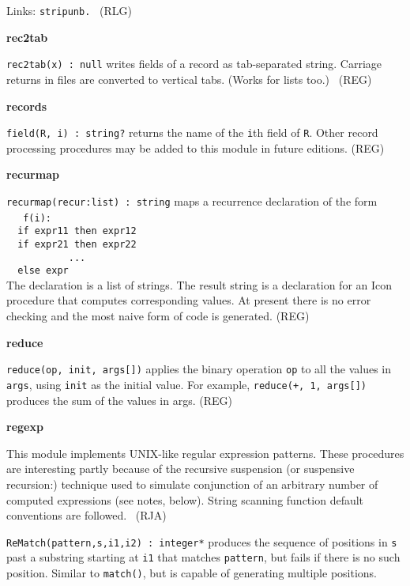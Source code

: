 Links: \texttt{stripunb.} \ (RLG)

{\sffamily\bfseries
rec2tab}

\texttt{rec2tab(x) : null} writes fields of a record as tab-separated
string. Carriage returns in files are converted to vertical tabs.
(Works for lists too.) \ (REG)

{\sffamily\bfseries
records}

\texttt{field(R, i) : string?} returns the name of the \texttt{i}th
field of \texttt{R}. Other record processing procedures may be added to
this module in future editions. (REG)

{\sffamily\bfseries
recurmap}

\texttt{recurmap(recur:list) : string} maps a recurrence declaration of
the form\\
 \ \ \texttt{\ f(i):\\
 \ \ if expr11 then expr12\\
 \ \ if expr21 then expr22\\
}\texttt{ \ \ \ \ \ \ \ \ \ \ ...\\
 \ \ else expr \\
}The declaration is a list of strings. The result string is a
declaration for an Icon procedure that computes corresponding values.
At present there is no error checking and the most naive form of code
is generated. (REG)

{\sffamily\bfseries
reduce}

\texttt{reduce(op, init, args[])} applies the binary
operation \texttt{op} to all the values in \texttt{args}, using
\texttt{init} as the initial value. For example,
\texttt{reduce({\textquotedbl}+{\textquotedbl}, 1, args[])} produces
the sum of the values in args. (REG)

{\sffamily\bfseries
regexp}

This module implements UNIX-like regular
expression patterns. These procedures are interesting partly because of
the {\textquotedbl}recursive suspension{\textquotedbl} (or
{\textquotedbl}suspensive recursion{\textquotedbl}:)
technique used to simulate conjunction of an arbitrary number of
computed expressions (see notes, below). String scanning function
default conventions are followed. \ (RJA)

\texttt{ReMatch(pattern,s,i1,i2) : integer*} produces the sequence of
positions in \texttt{s} past a substring starting at \texttt{i1} that
matches \texttt{pattern}, but fails if there is no such position.
Similar to \texttt{match()}, but is capable of generating multiple
positions.

